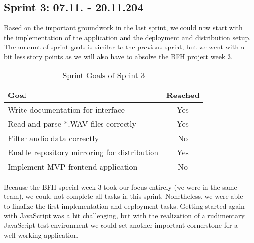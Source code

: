 \subsection{Sprint 3: 07.11. - 20.11.204}\label{subsec:sprint-3}
Based on the important groundwork in the last sprint, we could now start with the implementation of the application
and the deployment and distribution setup.
The amount of sprint goals is similar to the previous sprint, but we went with a bit less story points as we will also
have to absolve the BFH project week 3.
\begin{table}[H]
    \centering
    \begin{tabularx}{\textwidth}{X c}
        \toprule
        \textbf{Goal}                                         & \textbf{Reached} \\
        \midrule
        Write documentation for interface                     & Yes              \\
        \midrule
        Read and parse *.WAV  files correctly                 & Yes              \\
        \midrule
        Filter audio data correctly                           & No               \\
        \midrule
        Enable repository mirroring for distribution          & Yes              \\
        \midrule
        Implement MVP frontend application                    & No               \\
        \bottomrule
    \end{tabularx}
    \caption{Sprint Goals of Sprint 3}\label{tab:sprint_goals3}
\end{table}
Because the BFH special week 3 took our focus entirely (we were in the same team),
we could not complete all tasks in this sprint.
Nonetheless, we were able to finalize the first implementation and deployment tasks.
Getting started again with JavaScript was a bit challenging,
but with the realization of a rudimentary JavaScript test environment we could set another important cornerstone for
a well working application.


